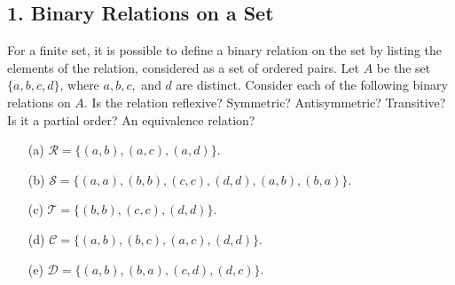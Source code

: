 \documentclass{article}
\begin{document}
\subsection*{1. Binary Relations on a Set}

For a finite set, it is possible to define a binary relation on the set by listing the elements of the relation, considered as a set of ordered pairs. Let $A$ be the set $\{a, b, c, d\}$, where $a, b, c,$ and $d$ are distinct. Consider each of the following binary relations on $A$. Is the relation reflexive? Symmetric? Antisymmetric? Transitive? Is it a partial order? An equivalence relation?

\begin{enumerate}
    \item[(a)] $\mathcal{R} = \{(a, b), (a, c), (a, d)\}$.
    \item[(b)] $\mathcal{S} = \{(a, a), (b, b), (c, c), (d, d), (a, b), (b, a)\}$.
    \item[(c)] $\mathcal{T} = \{(b, b), (c, c), (d, d)\}$.
    \item[(d)] $\mathcal{C} = \{(a, b), (b, c), (a, c), (d, d)\}$.
    \item[(e)] $\mathcal{D} = \{(a, b), (b, a), (c, d), (d, c)\}$.
\end{enumerate}
\end{document}
